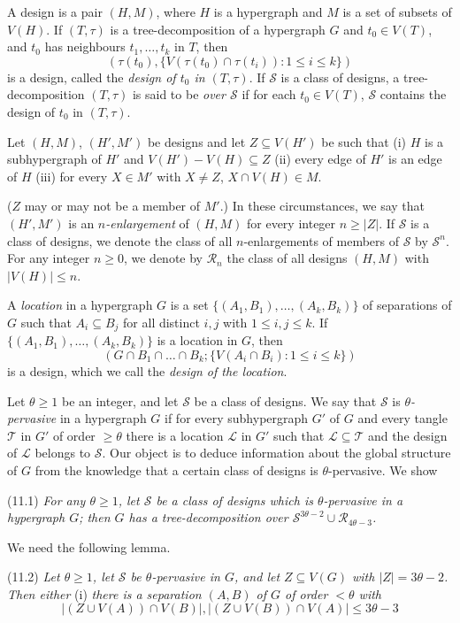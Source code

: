 A design is a pair $(H, M)$, where $H$ is a hypergraph and $M$ is a set of subsets of $V(H)$. If $(T, \tau)$ is a tree-decomposition of a hypergraph $G$ and $t_0 \in V(T)$, and $t_0$ has neighbours $t_1, \dots, t_k$ in $T$, then
\begin{equation*}
(\tau(t_0), \{V(\tau(t_0) \cap \tau(t_i)): 1 \le i \le k\})
\end{equation*}
is a design, called the \textit{design of $t_0$ in $(T, \tau)$}. If $\mathscr{S}$ is a class of designs, a tree-decomposition $(T, \tau)$ is said to be \textit{over $\mathscr{S}$} if for each $t_0 \in V(T)$, $\mathscr{S}$ contains the design of $t_0$ in $(T, \tau)$.

Let $(H, M)$, $(H', M')$ be designs and let $Z \subseteq V(H')$ be such that (i) $H$ is a subhypergraph of $H'$ and $V(H') - V(H) \subseteq Z$ (ii) every edge of $H'$ is an edge of $H$ (iii) for every $X \in M'$ with $X \ne Z$, $X \cap V(H) \in M$.

($Z$ may or may not be a member of $M'$.) In these circumstances, we say that $(H', M')$ is an \textit{$n$-enlargement} of $(H, M)$ for every integer $n \ge |Z|$. If $\mathscr{S}$ is a class of designs, we denote the class of all $n$-enlargements of members of $\mathscr{S}$ by $\mathscr{S}^n$. For any integer $n \ge 0$, we denote by $\mathscr{R}_n$ the class of all designs $(H, M)$ with $|V(H)| \le n$.

A \textit{location} in a hypergraph $G$ is a set $\{(A_1, B_1), \dots, (A_k, B_k)\}$ of separations of $G$ such that $A_i \subseteq B_j$ for all distinct $i, j$ with $1 \le i, j \le k$. If $\{(A_1, B_1), \dots, (A_k, B_k)\}$ is a location in $G$, then
\begin{equation*}
(G \cap B_1 \cap \dots \cap B_k; \{V(A_i \cap B_i): 1 \le i \le k\})
\end{equation*}
is a design, which we call the \textit{design of the location}.

Let $\theta \ge 1$ be an integer, and let $\mathscr{S}$ be a class of designs. We say that $\mathscr{S}$ is \textit{$\theta$-pervasive} in a hypergraph $G$ if for every subhypergraph $G'$ of $G$ and every tangle $\mathscr{T}$ in $G'$ of order $\ge \theta$ there is a location $\mathscr{L}$ in $G'$ such that $\mathscr{L} \subseteq \mathscr{T}$ and the design of $\mathscr{L}$ belongs to $\mathscr{S}$. Our object is to deduce information about the global structure of $G$ from the knowledge that a certain class of designs is $\theta$-pervasive. We show

\stmt
(11.1) \textit{For any $\theta \ge 1$, let $\mathscr{S}$ be a class of designs which is $\theta$-pervasive in a hypergraph $G$; then $G$ has a tree-decomposition over $\mathscr{S}^{3\theta - 2} \cup \mathscr{R}_{4\theta - 3}$.}

We need the following lemma.

\stmt
(11.2) \textit{Let $\theta \ge 1$, let $\mathscr{S}$ be $\theta$-pervasive in $G$, and let $Z \subseteq V(G)$ with $|Z| = 3\theta - 2$. Then either} (i) \textit{there is a separation $(A, B)$ of $G$ of order $< \theta$ with}
\begin{equation*}
|(Z \cup V(A)) \cap V(B)|, |(Z \cup V(B)) \cap V(A)| \le 3\theta - 3
\end{equation*}
